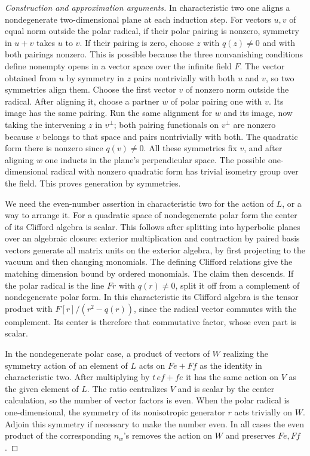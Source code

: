 \documentclass[11pt,a4paper,openany,oneside]{book}
\theoremstyle{resultstyle}
\theoremstyle{definition}
\numberwithin{equation}{chapter}
\begin{document}
\begin{proof}[Construction and approximation arguments]
In characteristic two one aligns a nondegenerate
two-dimensional plane at each induction step. For
vectors \(u,v\) of equal norm outside the polar radical,
if their polar pairing is nonzero, symmetry in \(u+v\)
takes \(u\) to \(v\). If their pairing is zero, choose
\(z\) with \(q(z)\ne0\) and with both pairings nonzero.
This is possible because the three nonvanishing
conditions define nonempty opens in a vector space
over the infinite field \(F\). The vector obtained
from \(u\) by symmetry in \(z\) pairs nontrivially with
both \(u\) and \(v\), so two symmetries align them.
Choose the first vector \(v\) of nonzero norm outside
the radical. After aligning it, choose a partner \(w\)
of polar pairing one with \(v\). Its image has the same
pairing. Run the same alignment for \(w\) and its image,
now taking the intervening \(z\) in \(v^\perp\); both
pairing functionals on \(v^\perp\) are nonzero because
\(v\) belongs to that space and pairs nontrivially
with both. The quadratic form there is nonzero since
\(q(v)\ne0\). All these symmetries fix \(v\), and after
aligning \(w\) one inducts in the plane's perpendicular
space. The possible one-dimensional radical with
nonzero quadratic form has trivial isometry group
over the field. This proves generation by symmetries.

We need the even-number assertion in characteristic
two for the action of \(L\), or a way to arrange it.
For a quadratic space of nondegenerate polar form the
center of its Clifford algebra is scalar. This follows
after splitting into hyperbolic planes over an algebraic
closure: exterior multiplication and contraction by
paired basis vectors generate all matrix units on the
exterior algebra, by first projecting to the vacuum and
then changing monomials. The defining Clifford relations
give the matching dimension bound by ordered monomials.
The claim then descends. If the polar radical is the
line \(Fr\) with \(q(r)\ne0\), split it off from a
complement of nondegenerate polar form. In this
characteristic its Clifford algebra is the tensor
product with \(F[r]/(r^2-q(r))\), since the radical
vector commutes with the complement. Its center is
therefore that commutative factor, whose even part is
scalar.

In the nondegenerate polar case, a product of vectors
of \(W\) realizing the symmetry action of an element
of \(L\) acts on \(Fe+Ff\) as the identity in characteristic
two. After multiplying by \(t\,ef+fe\) it has the same
action on \(V\) as the given element of \(L\).
The ratio centralizes \(V\) and is scalar by the center
calculation, so the number of vector factors is even.
When the polar radical is one-dimensional, the symmetry
of its nonisotropic generator \(r\) acts trivially on
\(W\). Adjoin this symmetry if necessary to make the
number even. In all cases the even product of the
corresponding \(n_w\)'s removes the action on \(W\)
and preserves \(Fe,Ff\).


\end{proof}
\end{document}
